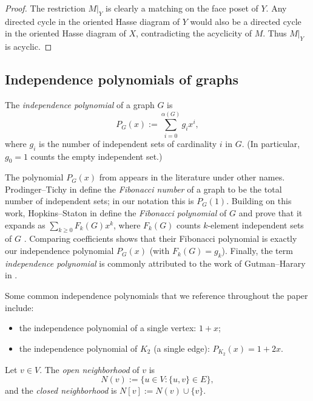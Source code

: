 \documentclass[12pt]{amsart}
\theoremstyle{plain}
\theoremstyle{definition}
\begin{document}
\begin{proof}
The restriction $M|_Y$ is clearly a matching on the face poset of $Y$. Any directed cycle in the
oriented Hasse diagram of $Y$ would also be a directed cycle in the oriented Hasse diagram of $X$,
contradicting the acyclicity of $M$. Thus $M|_Y$ is acyclic.
\end{proof}

\subsection{Independence polynomials of graphs}

\begin{defn}\label{def:indpoly}
The \emph{independence polynomial} of a graph $G$ is
\[
P_G(x) := \sum_{i=0}^{\alpha(G)} g_i x^i,
\]
where $g_i$ is the number of independent sets of cardinality $i$ in $G$. (In particular, $g_0=1$
counts the empty independent set.)
\end{defn}

\begin{remark}
The polynomial $P_G(x)$ from  appears in the literature under other names.
Prodinger--Tichy in \cite{ProdingerTichy1982} define the \emph{Fibonacci number} of a graph to be the
total number of independent sets; in our notation this is $P_G(1)$. Building on this work, Hopkins--Staton in \cite{Fibonacci} define the \emph{Fibonacci polynomial} of $G$ and prove that
it expands as $\sum_{k\ge 0} F_k(G)x^k$, where $F_k(G)$ counts $k$-element independent sets of $G$
\cite[Proposition~4]{Fibonacci}. Comparing coefficients shows that their Fibonacci polynomial is
exactly our independence polynomial $P_G(x)$ (with $F_k(G)=g_k$). Finally, the term \emph{independence
polynomial} is commonly attributed to the work of Gutman--Harary  in \cite{GutmanHarary1983}.
\end{remark}

\begin{remark}
Some common independence polynomials that we reference throughout the paper include:
\begin{itemize}
\item the independence polynomial of a single vertex: $1+x$;
\item the independence polynomial of $K_2$ (a single edge): $P_{K_2}(x)=1+2x$.
\end{itemize}
\end{remark}

\begin{defn}
Let $v\in V$. The \emph{open neighborhood} of $v$ is
\[
N(v):=\{u\in V : \{u,v\}\in E\},
\]
and the \emph{closed neighborhood} is $N[v]:=N(v)\cup\{v\}$.
\end{defn}
\end{document}
